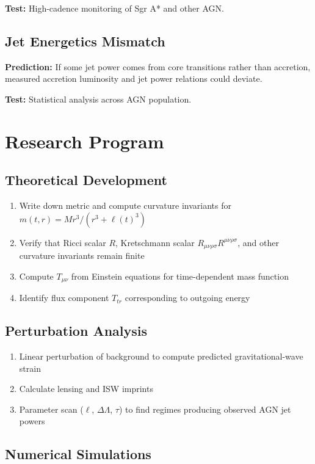 \documentclass[11pt,a4paper]{article}
\begin{document}
\textbf{Test:} High-cadence monitoring of Sgr A* and other AGN.

\subsection{Jet Energetics Mismatch}

\textbf{Prediction:} If some jet power comes from core transitions rather than accretion, measured accretion luminosity and jet power relations could deviate.

\textbf{Test:} Statistical analysis across AGN population.

\section{Research Program}

\subsection{Theoretical Development}

\begin{enumerate}
\item Write down metric and compute curvature invariants for $m(t,r)=M r^3/(r^3+\ell(t)^3)$
\item Verify that Ricci scalar $R$, Kretschmann scalar $R_{\mu\nu\rho\sigma}R^{\mu\nu\rho\sigma}$, and other curvature invariants remain finite
\item Compute $T_{\mu\nu}$ from Einstein equations for time-dependent mass function
\item Identify flux component $T_{tr}$ corresponding to outgoing energy
\end{enumerate}

\subsection{Perturbation Analysis}

\begin{enumerate}
\item Linear perturbation of background to compute predicted gravitational-wave strain
\item Calculate lensing and ISW imprints
\item Parameter scan ($\ell$, $\Delta\Lambda$, $\tau$) to find regimes producing observed AGN jet powers
\end{enumerate}

\subsection{Numerical Simulations}
\end{document}
